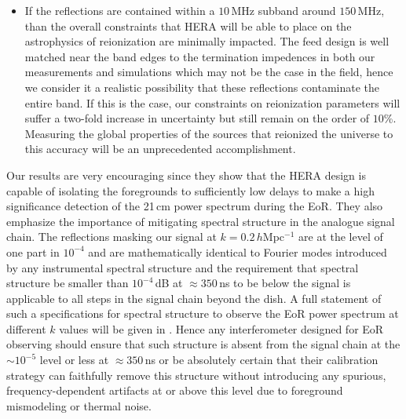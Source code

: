 \documentclass[twocolumn]{emulateapj}
\begin{document}
\begin{itemize}
\item If the reflections are contained within a $10$\,MHz subband around $150$\,MHz, than the overall constraints that HERA will be able to place on the astrophysics of reionization are minimally impacted. The feed design is well matched near the band edges to the termination impedences in both our measurements and simulations which may not be the case in the field, hence we consider it a realistic possibility that these reflections contaminate the entire band. If this is the case, our constraints on reionization parameters will suffer a two-fold increase in uncertainty but still remain on the order of $10$\%. Measuring the global properties of the sources that reionized the universe to this accuracy will be an unprecedented accomplishment. 
\end{itemize}

	
Our results are very encouraging since they show that the HERA design is capable of isolating the foregrounds to sufficiently low delays to make a high significance detection of the 21\,cm power spectrum during the EoR. They also emphasize the importance of mitigating spectral structure in the analogue signal chain. The reflections masking our signal at $k=0.2$\,$h$Mpc$^{-1}$ are at the level of one part in $10^{-4}$ and are mathematically identical to Fourier modes introduced by any instrumental spectral structure and the requirement that spectral structure be smaller than $10^{-4}$\,dB at $\approx 350$\,ns to be below the signal is applicable to all steps in the signal chain beyond the dish. A full statement of such a specifications for spectral structure to observe the EoR power spectrum at different $k$ values will be given in \citet{Thyagarajan:2016}. Hence any interferometer designed for EoR observing should ensure that such structure is absent from the signal chain at the $\sim10^{-5}$ level or less at $\approx 350$\,ns or be absolutely certain that their calibration strategy can faithfully remove this structure without introducing any spurious, frequency-dependent artifacts at or above this level due to foreground mismodeling or thermal noise.




\end{document}
